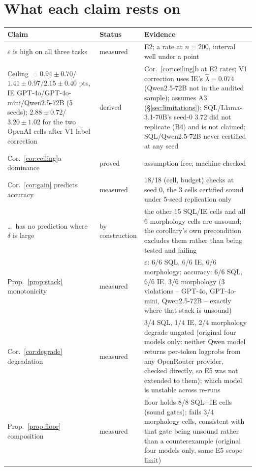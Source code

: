 \documentclass[11pt]{article}
\begin{document}
\section{What each claim rests on}\label{app:claims}
\begin{table}[!htbp]\centering\footnotesize
\setlength{\tabcolsep}{3pt}
\begin{tabular}{@{}p{3.15cm}p{1.5cm}p{2.5cm}@{}}
\toprule
Claim & Status & Evidence \\
\midrule
$\varepsilon$ is high on all three tasks & measured & E2; a rate at $n{=}200$, interval well under a point \\[2pt]
Ceiling $=0.94\pm0.70$/$1.41\pm0.97$/$2.15\pm0.40$ pts, IE GPT-4o/GPT-4o-mini/Qwen2.5-72B (5 seeds); $2.88\pm0.72$/$3.20\pm1.02$ for the two OpenAI cells after V1 label correction & derived & Cor.~\ref{cor:ceiling}b at E2 rates; V1 correction uses IE's $\hat\lambda=0.074$ (Qwen2.5-72B not in the audited sample); assumes A3 (\S\ref{sec:limitations}); SQL/Llama-3.1-70B's seed-0 $3.72$ did not replicate (B4) and is not claimed; SQL/Qwen2.5-72B never certified at any seed \\[2pt]
Cor.~\ref{cor:ceiling}a dominance & proved & assumption-free; machine-checked \\[2pt]
Cor.~\ref{cor:gain} predicts accuracy & measured & 18/18 (cell, budget) checks at seed 0, the 3 cells certified sound under 5-seed replication only \\[2pt]
\dots\ has no prediction where $\delta$ is large & by construction & the other 15 SQL/IE cells and all 6 morphology cells are unsound; the corollary's own precondition excludes them rather than being tested and failing \\[2pt]
Prop.~\ref{prop:stack} monotonicity & measured & $\varepsilon$: 6/6 SQL, 6/6 IE, 6/6 morphology; accuracy: 6/6 SQL, 6/6 IE, 3/6 morphology (3 violations -- GPT-4o, GPT-4o-mini, Qwen2.5-72B -- exactly where that stack is unsound) \\[2pt]
Cor.~\ref{cor:degrade} degradation & measured & 3/4 SQL, 1/4 IE, 2/4 morphology degrade ungated (original four models only: neither Qwen model returns per-token logprobs from any OpenRouter provider, checked directly, so E5 was not extended to them); which model is unstable across re-runs \\[2pt]
Prop.~\ref{prop:floor} composition & measured & floor holds 8/8 SQL+IE cells (sound gates); fails 3/4 morphology cells, consistent with that gate being unsound rather than a counterexample (original four models only, same E5 scope limit) \\[2pt]

\end{tabular}
\end{table}
\end{document}
